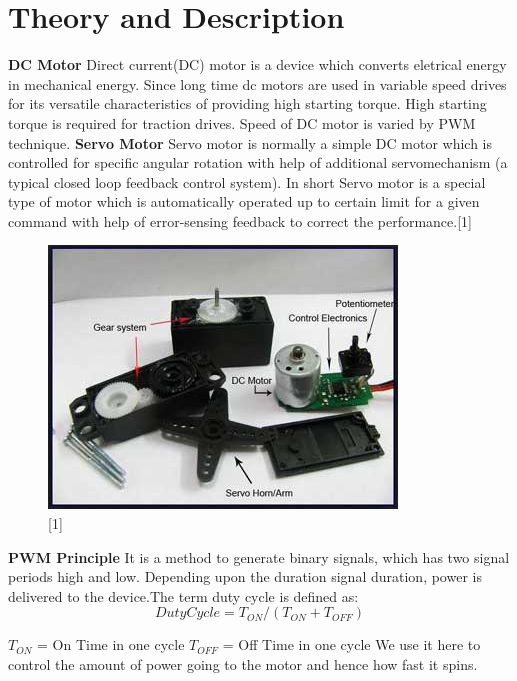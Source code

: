 \documentclass[11pt,a4paper]{article}
\begin{document}
	\section{Theory and Description}
	\textbf{DC Motor}
	\newline
	 Direct current(DC) motor is a device which converts eletrical energy in mechanical energy. Since long time dc motors are used in variable speed drives for its versatile characteristics of providing high starting torque. High starting torque is required for traction drives. Speed of DC motor is varied by PWM technique.
	 \flushleft
	 \textbf{Servo Motor}
	 \newline
	 	Servo motor is normally a simple DC motor which is controlled for specific angular rotation with help of additional servomechanism (a typical closed loop feedback control system). 
	 	\newline
	 	In short Servo motor is a special type of motor which is automatically operated up to certain limit for a given command with help of error-sensing feedback to correct the performance.[1]
	 	
	 	\begin{figure}[h!]
	 		\includegraphics[scale=0.8]{sm.jpg}
	 		\centering
	 		\caption{[1]}
	 	\end{figure}
	 \textbf{PWM Principle}
	 \newline
	 It is a method to generate binary signals, which has two signal periods high and low. Depending upon the duration signal duration, power is delivered to the device.The term duty cycle is defined as:
	 \newline
	 \begin{equation}
	 	Duty Cycle = T_{ON}/(T_{ON} + T_{OFF})
	 \end{equation}
	 
	 $T_{ON}$ = On Time in one cycle \newline
	 $T_{OFF}$ = Off Time in one cycle
	 \newline
	 We use it here to control the amount of power going to the motor and hence how fast it spins.
	 
\end{document}
